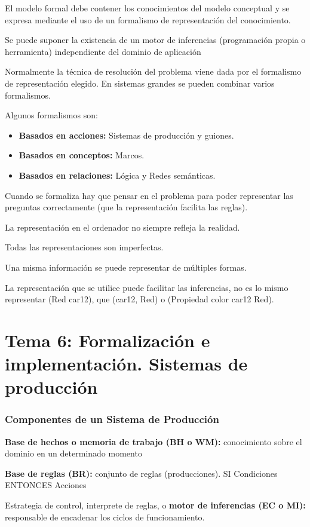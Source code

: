 \documentclass[12pt, twoside, openright]{report} %
\begin{document}
El modelo formal debe contener los conocimientos del modelo conceptual y se expresa mediante el uso de un formalismo de representación del conocimiento.

Se puede suponer la existencia de un motor de inferencias (programación propia o herramienta) independiente del dominio de aplicación

Normalmente la técnica de resolución del problema viene dada por el formalismo de representación elegido. En sistemas grandes se pueden combinar varios formalismos. 

Algunos formalismos son:
\begin{itemize}
	\item \textbf{Basados en acciones:} Sistemas de producción y guiones.
	\item \textbf{Basados en conceptos:} Marcos.
	\item \textbf{Basados en relaciones:} Lógica y Redes semánticas.
\end{itemize}

Cuando se formaliza hay que pensar en el problema para poder representar las preguntas correctamente (que la representación facilita las reglas).

La representación en el ordenador no siempre refleja la realidad. 

Todas las representaciones son imperfectas.

Una misma información se puede representar de múltiples formas.

La representación que se utilice puede facilitar las inferencias, no es lo mismo representar (Red car12), que (car12, Red) o (Propiedad color car12 Red).

\chapter{Tema 6: Formalización e implementación. Sistemas de producción}
\subsection{Componentes de un Sistema de Producción}
\textbf{Base de hechos o memoria de trabajo (BH o WM):} conocimiento sobre el dominio en un determinado momento

\textbf{Base de reglas (BR):} conjunto de reglas (producciones). SI Condiciones ENTONCES Acciones

Estrategia de control, interprete de reglas, o \textbf{motor de inferencias (EC o MI):} responsable de encadenar los ciclos de funcionamiento.
\end{document}
